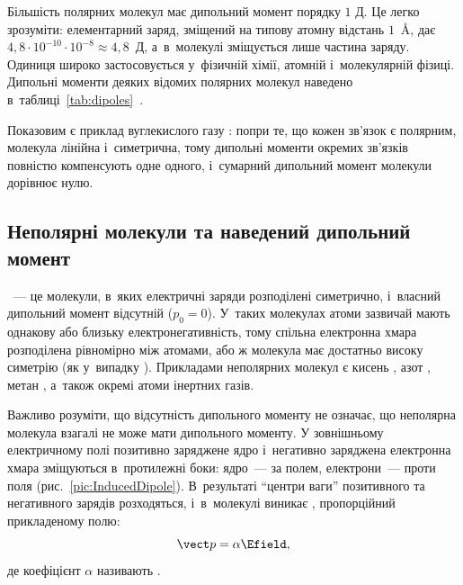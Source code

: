 Більшість полярних молекул має дипольний момент порядку $1$ Д. Це легко зрозуміти:
елементарний заряд, зміщений на типову атомну відстань $1$~Å, дає
$4{,}8\cdot10^{-10}\cdot10^{-8} \approx 4{,}8$~Д, а~в~молекулі зміщується лише частина заряду. Одиниця широко
застосовується у~фізичній хімії, атомній і~молекулярній фізиці. Дипольні моменти деяких
відомих полярних молекул наведено в~таблиці~\ref{tab:dipoles}~\cite{CRC106}.

Показовим є приклад вуглекислого газу : попри те, що кожен зв'язок  є
полярним, молекула лінійна і~симетрична, тому дипольні моменти окремих зв'язків повністю
компенсують одне одного, і~сумарний дипольний момент молекули дорівнює нулю.


\subsection*{Неполярні молекули та наведений дипольний момент}


~--- це молекули, в~яких електричні заряди розподілені
симетрично, і~власний дипольний момент відсутній ($p_0 = 0$). У~таких молекулах атоми
зазвичай мають однакову або близьку електронегативність, тому спільна електронна хмара
розподілена рівномірно між атомами, або ж молекула має достатньо високу симетрію (як
у~випадку ). Прикладами неполярних молекул є кисень , азот ,
метан , а~також окремі атоми інертних газів.

Важливо розуміти, що відсутність  дипольного моменту не означає, що
неполярна молекула взагалі не може мати дипольного моменту. У зовнішньому електричному
полі позитивно заряджене ядро і~негативно заряджена електронна хмара зміщуються
в~протилежні боки: ядро~--- за полем, електрони~--- проти поля
(рис.~\ref{pic:InducedDipole}). В~результаті \enquote{центри ваги} позитивного та
негативного зарядів розходяться, і~в~молекулі виникає , пропорційний прикладеному полю:
\begin{equation}\label{eq:InducedDipole}
	\vect p = \alpha \Efield,
\end{equation}
де коефіцієнт $\alpha$ називають .


